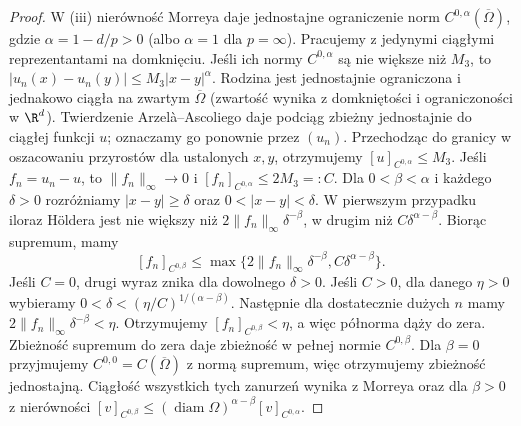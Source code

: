 \begin{proof}
W (iii) nierówność Morreya daje jednostajne ograniczenie
norm $C^{0,\alpha}(\overline\Omega)$, gdzie
$\alpha=1-d/p>0$ (albo $\alpha=1$ dla $p=\infty$).
Pracujemy z jedynymi ciągłymi reprezentantami
na domknięciu. Jeśli ich normy $C^{0,\alpha}$
są nie większe niż $M_3$, to
$|u_n(x)-u_n(y)|\le M_3|x-y|^\alpha$.
Rodzina jest jednostajnie ograniczona i jednakowo
ciągła na zwartym $\overline\Omega$ (zwartość wynika
z domkniętości i ograniczoności w $\R^d$).
Twierdzenie Arzelà--Ascoliego daje podciąg zbieżny
jednostajnie do ciągłej funkcji $u$; oznaczamy go
ponownie przez $(u_n)$.
Przechodząc do granicy w oszacowaniu przyrostów
dla ustalonych $x,y$, otrzymujemy
$[u]_{C^{0,\alpha}}\le M_3$.
Jeśli $f_n=u_n-u$, to $\|f_n\|_\infty\to0$
i $[f_n]_{C^{0,\alpha}}\le 2M_3=:C$.
Dla $0<\beta<\alpha$ i każdego $\delta>0$
rozróżniamy $|x-y|\ge\delta$ oraz $0<|x-y|<\delta$.
W pierwszym przypadku iloraz Höldera jest nie większy
niż $2\|f_n\|_\infty\delta^{-\beta}$, w drugim
niż $C\delta^{\alpha-\beta}$. Biorąc supremum, mamy
\[
 [f_n]_{C^{0,\beta}}
 \le\max\{2\|f_n\|_\infty\delta^{-\beta},
 C\delta^{\alpha-\beta}\}.
\]
Jeśli $C=0$, drugi wyraz znika dla dowolnego $\delta>0$.
Jeśli $C>0$, dla danego $\eta>0$ wybieramy
$0<\delta<(\eta/C)^{1/(\alpha-\beta)}$.
Następnie dla dostatecznie dużych $n$ mamy
$2\|f_n\|_\infty\delta^{-\beta}<\eta$.
Otrzymujemy $[f_n]_{C^{0,\beta}}<\eta$, a więc
półnorma dąży do zera. Zbieżność supremum do zera
daje zbieżność w pełnej normie $C^{0,\beta}$.
Dla $\beta=0$ przyjmujemy $C^{0,0}=C(\overline\Omega)$
z normą supremum, więc otrzymujemy zbieżność jednostajną.
Ciągłość wszystkich tych zanurzeń wynika z Morreya
oraz dla $\beta>0$ z nierówności
$[v]_{C^{0,\beta}}\le
(\operatorname{diam}\Omega)^{\alpha-\beta}
[v]_{C^{0,\alpha}}$.
\end{proof}

